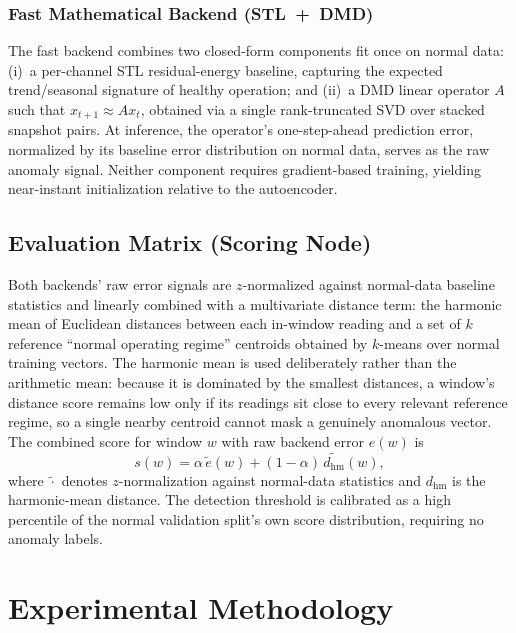 \subsubsection{Fast Mathematical Backend (STL~+~DMD)}
The fast backend combines two closed-form components fit once on normal
data: (i)~a per-channel STL residual-energy baseline, capturing the
expected trend/seasonal signature of healthy operation; and (ii)~a DMD
linear operator $A$ such that $x_{t+1} \approx A x_t$, obtained via a
single rank-truncated SVD over stacked snapshot pairs. At inference, the
operator's one-step-ahead prediction error, normalized by its baseline
error distribution on normal data, serves as the raw anomaly signal.
Neither component requires gradient-based training, yielding near-instant
initialization relative to the autoencoder.

\subsection{Evaluation Matrix (Scoring Node)}
Both backends' raw error signals are $z$-normalized against normal-data
baseline statistics and linearly combined with a multivariate distance
term: the harmonic mean of Euclidean distances between each in-window
reading and a set of $k$ reference ``normal operating regime'' centroids
obtained by $k$-means over normal training vectors. The harmonic mean is
used deliberately rather than the arithmetic mean: because it is dominated
by the smallest distances, a window's distance score remains low only if
its readings sit close to every relevant reference regime, so a single
nearby centroid cannot mask a genuinely anomalous vector. The combined
score for window $w$ with raw backend error $e(w)$ is
\begin{equation}
s(w) = \alpha \, \tilde{e}(w) + (1-\alpha)\, \widetilde{d_{\mathrm{hm}}}(w),
\label{eq:score}
\end{equation}
where $\tilde{\cdot}$ denotes $z$-normalization against normal-data
statistics and $d_{\mathrm{hm}}$ is the harmonic-mean distance. The
detection threshold is calibrated as a high percentile of the normal
validation split's own score distribution, requiring no anomaly labels.

\section{Experimental Methodology}

